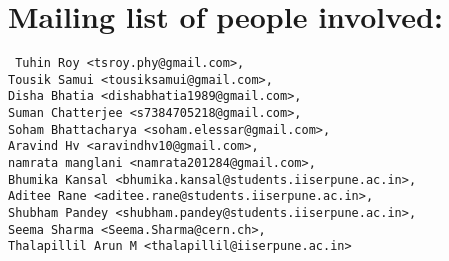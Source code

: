 \section{Mailing list of people involved:}
{ \tt
	Tuhin Roy <tsroy.phy@gmail.com>,\\
	Tousik Samui <tousiksamui@gmail.com>,\\
	Disha Bhatia <dishabhatia1989@gmail.com>,\\
	Suman Chatterjee <s7384705218@gmail.com>,\\
	Soham Bhattacharya <soham.elessar@gmail.com>,\\
	Aravind Hv <aravindhv10@gmail.com>,\\
	namrata manglani <namrata201284@gmail.com>,\\
	Bhumika Kansal <bhumika.kansal@students.iiserpune.ac.in>,\\
	Aditee Rane <aditee.rane@students.iiserpune.ac.in>,\\
	Shubham Pandey <shubham.pandey@students.iiserpune.ac.in>,\\
	Seema Sharma <Seema.Sharma@cern.ch>,\\
	Thalapillil Arun M <thalapillil@iiserpune.ac.in>
}